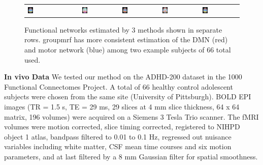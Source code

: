 \documentclass[runningheads,a4paper]{llncs}
\begin{document}
\begin{figure}[htb]
\begin{tabular}{lcc|cc|cc}
\includegraphics[width=0.15\textwidth]{figure2/mrf_grp_z32} &
\includegraphics[width=0.15\textwidth]{figure2/mrf_sub1_z25} &
\includegraphics[width=0.15\textwidth]{figure2/mrf_sub1_z32} &
\includegraphics[width=0.15\textwidth]{figure2/mrf_sub2_z25} &
\includegraphics[width=0.15\textwidth]{figure2/mrf_sub2_z32}
\end{tabular}
\caption{Functional networks estimated by 3 methods shown in separate rows. \textsf{groupmrf} has more consistent estimation of the DMN (red) and motor network (blue) among two example subjects of 66 total used.}
\vspace*{-8pt}
\label{fig:fig2}
\end{figure}

\noindent\textbf{In vivo Data} We tested our method on the ADHD-200 dataset in the
1000 Functional Connectomes Project. A total of 66 healthy control adolescent
subjects were chosen from the same site (University of Pittsburgh). BOLD EPI
images (TR = 1.5 s, TE = 29 ms, 29 slices at 4 mm slice thickness, 64 x 64
matrix, 196 volumes) were acquired on a Siemens 3 Tesla Trio scanner. The fMRI
volumes were motion corrected, slice timing corrected, registered to NIHPD
object 1 atlas, bandpass filtered to 0.01 to 0.1 Hz, regressed out nuisance
variables including white matter, CSF mean time courses and six motion
parameters, and at last filtered by a 8 mm Gaussian filter for spatial
smoothness.
\end{document}
